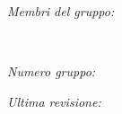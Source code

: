 \begin{titlepage}
    \begin{minipage}{0.4\textwidth}
    \begin{flushleft}
    \large
    \textit{Membri del gruppo:}\\
    \@author %
    \end{flushleft}
    \end{minipage}
    ~
    \begin{minipage}{0.4\textwidth}
    \begin{flushright}
    \large
    \textit{Numero gruppo: }
    \groupNumber
    \end{flushright}
    \end{minipage}
    
    
    
    \vfill\vfill
    \textit{Ultima revisione:}
    {\@date}
    
    \end{titlepage}